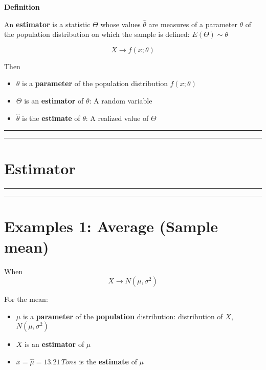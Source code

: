 \documentclass[
]{book}
\providecommand{\tightlist}{%
  \setlength{\itemsep}{0pt}\setlength{\parskip}{0pt}}
\begin{document}
\textbf{Definition}

An \textbf{estimator} is a statistic \(\Theta\) whose values \(\hat{\theta}\) are measures of a parameter \(\theta\) of the population distribution on which the sample is defined: \(E(\Theta)\sim \theta\)

\[X \rightarrow f(x; \theta)\]

Then

\begin{itemize}
\tightlist
\item
  \(\theta\) is a \textbf{parameter} of the population distribution \(f(x; \theta)\)
\item
  \(\Theta\) is an \textbf{estimator} of \(\theta\): A random variable
\item
  \(\hat{\theta}\) is the \textbf{estimate} of \(\theta\): A realized value of \(\Theta\)
\end{itemize}

\begin{center}\rule{0.5\linewidth}{0.5pt}\end{center}

\begin{center}\rule{0.5\linewidth}{0.5pt}\end{center}

\hypertarget{estimator-1}{%
\section{Estimator}\label{estimator-1}}

\begin{center}\rule{0.5\linewidth}{0.5pt}\end{center}

\begin{center}\rule{0.5\linewidth}{0.5pt}\end{center}

\hypertarget{examples-1-average-sample-mean}{%
\section{Examples 1: Average (Sample mean)}\label{examples-1-average-sample-mean}}

When \[X \rightarrow N(\mu, \sigma^2)\]

For the mean:

\begin{itemize}
\tightlist
\item
  \(\mu\) is a \textbf{parameter} of the \textbf{population} distribution: distribution of \(X\), \(N(\mu, \sigma^2)\)
\item
  \(\bar{X}\) is an \textbf{estimator} of \(\mu\)
\item
  \(\bar{x}=\hat{\mu}=13.21 \, Tons\) is the \textbf{estimate} of \(\mu\)
\end{itemize}
\end{document}
